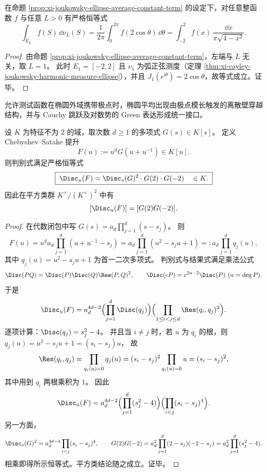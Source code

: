 \begin{corollary}[椭圆--线段塌缩的母体恒等式]\label{cor:xi-joukowsky-ellipse-collapse-arcsine-master}
在命题 \ref{prop:xi-joukowsky-ellipse-average-constant-term} 的设定下，对任意整函数 \(f\) 与任意 \(L>0\) 有严格恒等式
\[
\int_{E_L} f(S)\,\dd\nu_L(S)
=\frac{1}{2\pi}\int_{0}^{2\pi} f(2\cos\theta)\,\dd\theta
=\int_{-2}^{2} f(x)\,\frac{\dd x}{\pi\sqrt{4-x^2}}.
\]
\end{corollary}
\begin{proof}
由命题 \ref{prop:xi-joukowsky-ellipse-average-constant-term}，左端与 \(L\) 无关，取 \(L=1\)。
此时 \(E_1=[-2,2]\) 且 \(\nu_1\) 为弧正弦测度（定理 \ref{thm:xi-cayley-joukowsky-harmonic-measure-ellipse}），并且 \(J_1(e^{\mathrm{i}\theta})=2\cos\theta\)，故等式成立。证毕。
\end{proof}



允许测试函数在椭圆外域携带极点时，椭圆平均出现由极点模长触发的离散壁穿越结构，并与 Cauchy 跳跃及对数势的 Green 表达形成统一接口。



\begin{proposition}\label{prop:xi-chebyshev-satake-discriminant-endpoint-localization}
设 \(K\) 为特征不为 \(2\) 的域，取次数 \(d\ge 1\) 的多项式 \(G(s)\in K[s]\)。
定义 Chebyshev--Satake 提升
\[
F(u):=u^{d}G(u+u^{-1})\in K[u].
\]
则判别式满足严格恒等式
\[
\boxed{\;
\Disc_u(F)=\Disc_s(G)^2\cdot G(2)\cdot G(-2)\quad\in K.\;}
\]
因此在平方类群 \(K^\times/(K^\times)^2\) 中有
\[
[\Disc_u(F)]=[G(2)G(-2)].
\]
\end{proposition}
\begin{proof}
在代数闭包中写 \(G(s)=a_d\prod_{j=1}^{d}(s-s_j)\)。
则
\[
F(u)=u^{d}a_d\prod_{j=1}^{d}(u+u^{-1}-s_j)
=a_d\prod_{j=1}^{d}(u^2-s_j u+1)
  =:a_d\prod_{j=1}^{d}q_j(u),
\]
其中 \(q_j(u)=u^2-s_j u+1\) 为首一二次多项式。
判别式与结果式满足乘法公式
\[
\Disc(PQ)=\Disc(P)\Disc(Q)\Res(P,Q)^2,
\qquad
\Disc(cP)=c^{2n-2}\Disc(P)\ (n=\deg P).
\]
于是
\[
\Disc_u(F)
=a_d^{4d-2}\Bigl(\prod_{j=1}^{d}\Disc(q_j)\Bigr)\Bigl(\prod_{1\le i<j\le d}\Res(q_i,q_j)^2\Bigr).
\]
逐项计算：\(\Disc(q_j)=s_j^2-4\)。
并且当 \(i\neq j\) 时，若 \(u\) 为 \(q_i\) 的根，则
\(
q_j(u)=u^2-s_j u+1=(s_i-s_j)u
\)，
故
\[
\Res(q_i,q_j)=\prod_{q_i(u)=0}q_j(u)=(s_i-s_j)^2\prod_{q_i(u)=0}u=(s_i-s_j)^2,
\]
其中用到 \(q_i\) 两根乘积为 \(1\)。
因此
\[
\Disc_u(F)=a_d^{4d-2}\Bigl(\prod_{j=1}^{d}(s_j^2-4)\Bigr)\Bigl(\prod_{i<j}(s_i-s_j)^4\Bigr).
\]
另一方面，
\[
\Disc_s(G)^2=a_d^{4d-4}\prod_{i<j}(s_i-s_j)^4,
\qquad
G(2)G(-2)=a_d^{2}\prod_{j=1}^{d}(2-s_j)(-2-s_j)=a_d^2\prod_{j=1}^{d}(s_j^2-4).
\]
相乘即得所示恒等式。平方类结论随之成立。证毕。
\end{proof}

